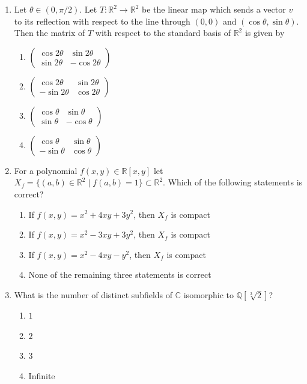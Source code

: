 \documentclass[11pt, a4paper]{article}
\begin{document}
\begin{enumerate}
  \item Let $\theta \in (0, \pi/2)$. Let $T: \mathbb{R}^2 \to \mathbb{R}^2$ be the linear map which sends a vector $v$ to its reflection with respect to the line through $(0,0)$ and $(\cos\theta, \sin\theta)$. Then the matrix of $T$ with respect to the standard basis of $\mathbb{R}^2$ is given by
  \begin{enumerate}[label=(\alph*)]
    \item $\begin{pmatrix} \cos 2\theta & \sin 2\theta \\ \sin 2\theta & -\cos 2\theta \end{pmatrix}$
    \item $\begin{pmatrix} \cos 2\theta & \sin 2\theta \\ -\sin 2\theta & \cos 2\theta \end{pmatrix}$
    \item $\begin{pmatrix} \cos\theta & \sin\theta \\ \sin\theta & -\cos\theta \end{pmatrix}$
    \item $\begin{pmatrix} \cos\theta & \sin\theta \\ -\sin\theta & \cos\theta \end{pmatrix}$
  \end{enumerate}

  \item For a polynomial $f(x, y) \in \mathbb{R}[x, y]$ let $X_f = \{(a, b) \in \mathbb{R}^2 \mid f(a, b) = 1\} \subset \mathbb{R}^2$. Which of the following statements is correct?
  \begin{enumerate}[label=(\alph*)]
    \item If $f(x, y) = x^2 + 4xy + 3y^2$, then $X_f$ is compact
    \item If $f(x, y) = x^2 - 3xy + 3y^2$, then $X_f$ is compact
    \item If $f(x, y) = x^2 - 4xy - y^2$, then $X_f$ is compact
    \item None of the remaining three statements is correct
  \end{enumerate}

  \item What is the number of distinct subfields of $\mathbb{C}$ isomorphic to $\mathbb{Q}[\sqrt[3]{2}]$?
  \begin{enumerate}[label=(\alph*)]
    \item $1$
    \item $2$
    \item $3$
    \item Infinite
  \end{enumerate}


\end{enumerate}
\end{document}
